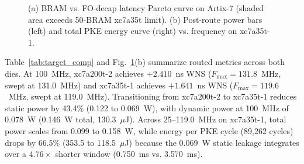 \documentclass[journal]{IEEEtran}
\begin{document}
\begin{figure}[t]
{%
}
\caption{(a) BRAM vs. FO-decap latency Pareto curve on Artix-7 (shaded area exceeds 50-BRAM xc7a35t limit). (b) Post-route power bars (left) and total PKE energy curve (right) vs. frequency on xc7a35t-1.}
\label{fig:charts}
\end{figure}

Table~\ref{tab:target_comp} and Fig.~\ref{fig:charts}(b) summarize routed metrics across both dies. At 100~MHz, xc7a200t-2 achieves $+2.410$~ns WNS ($F_{\max}=131.8$~MHz, swept at 131.0~MHz) and xc7a35t-1 achieves $+1.641$~ns WNS ($F_{\max}=119.6$~MHz, swept at 119.0~MHz). Transitioning from xc7a200t-2 to xc7a35t-1 reduces static power by 43.4\% (0.122 to 0.069~W), with dynamic power at 100~MHz of 0.078~W (0.146~W total, 130.3~$\mu$J). Across 25--119.0~MHz on xc7a35t-1, total power scales from 0.099 to 0.158~W, while energy per PKE cycle (89,262 cycles) drops by 66.5\% (353.5 to 118.5~$\mu$J) because the 0.069~W static leakage integrates over a $4.76\times$ shorter window (0.750~ms vs. 3.570~ms).
\end{document}

